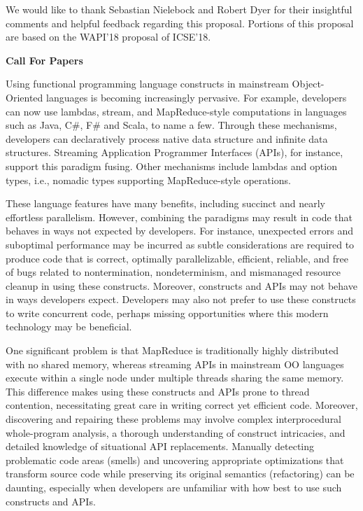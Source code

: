 \documentclass[10pt, conference]{IEEEtran}
\begin{document}
We would like to thank Sebastian Nielebock and Robert Dyer for their insightful comments and helpful feedback regarding this proposal. Portions of this proposal are based on the WAPI'18 proposal of ICSE'18.


% 


\newpage
\onecolumn

\begin{center}
	\textbf{Call For Papers}
\end{center}

Using functional programming language constructs in mainstream Object-Oriented languages is becoming increasingly pervasive. For example, developers can now use lambdas, stream, and MapReduce-style computations in languages such as Java, C\#, F\# and Scala, to name a few. Through these mechanisms, developers can declaratively process native data structure 
and infinite data structures. Streaming Application Programmer Interfaces (APIs), for instance,
support this paradigm fusing. Other mechanisms include lambdas
and option types, i.e., nomadic types supporting MapReduce-style operations.

These language features have many benefits, including succinct and nearly effortless
parallelism. However, combining the paradigms may result in code that behaves in ways not expected by developers. For instance, unexpected errors and suboptimal performance may be incurred as subtle considerations are required to produce code that is correct, optimally parallelizable, efficient, reliable, and free of bugs related to nontermination, nondeterminism, and mismanaged resource cleanup in using these constructs. Moreover, constructs and APIs may not behave in ways developers expect. Developers may also not prefer to use these constructs to write concurrent code, perhaps missing opportunities where this modern technology may be beneficial.

One significant problem is that MapReduce is traditionally highly distributed with no shared memory, whereas streaming APIs in mainstream OO languages execute within a single node under multiple threads sharing the same memory. This difference makes using these constructs and APIs prone to 
thread contention, necessitating great care in writing correct yet efficient code. Moreover, discovering and repairing these problems may involve complex interprocedural whole-program analysis, a thorough understanding of construct intricacies, and detailed knowledge of situational API replacements. Manually detecting problematic code areas (smells) and uncovering appropriate optimizations that transform source code while preserving its original semantics (refactoring) can be daunting, especially
when developers are unfamiliar with how best to use such constructs and APIs.
\end{document}
